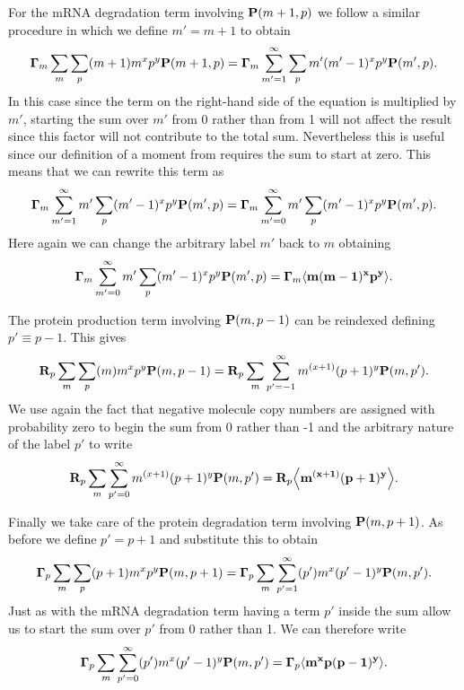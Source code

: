 For the mRNA degradation term involving $\mathbf{P}(m + 1, p)$ we follow a similar
procedure in which we define $m' = m + 1$ to obtain
\begin{equation}
  \mathbf{\Gamma}_m \sum_m \sum_p (m + 1) m^x p^y \mathbf{P}(m + 1, p) =
  \mathbf{\Gamma}_m \sum_{m' = 1}^\infty \sum_p m' (m' - 1)^x p^y \mathbf{P}(m', p).
\end{equation}
In this case since the term on the right-hand side of the equation is multiplied
by $m'$, starting the sum over $m'$ from 0 rather than from 1 will not affect
the result since this factor will not contribute to the total sum. Nevertheless
this is useful since our definition of a moment from  requires
the sum to start at zero. This means that we can rewrite this term as
\begin{equation}
  \mathbf{\Gamma}_m \sum_{m' = 1}^\infty m' \sum_p (m' - 1)^x p^y \mathbf{P}(m', p) =
  \mathbf{\Gamma}_m \sum_{m' = 0}^\infty m' \sum_p (m' - 1)^x p^y \mathbf{P}(m', p).
\end{equation}
Here again we can change the arbitrary label $m'$ back to $m$ obtaining
\begin{equation}
  \mathbf{\Gamma}_m \sum_{m' = 0}^\infty m' \sum_p (m' - 1)^x p^y \mathbf{P}(m', p) =
  \mathbf{\Gamma}_m \mathbf{\left\langle m (m - 1)^x p^y \right\rangle}.
\end{equation}

The protein production term involving $\mathbf{P}(m, p - 1)$ can be reindexed defining
$p' \equiv p - 1$. This gives
\begin{equation}
  \mathbf{R}_p \sum_m \sum_p (m) m^x p^y \mathbf{P}(m, p - 1) =
  \mathbf{R}_p \sum_m \sum_{p'=-1}^\infty m^{(x + 1)} (p + 1)^y \mathbf{P}(m, p').
\end{equation}
We use again the fact that negative molecule copy numbers are assigned with
probability zero to begin the sum from 0 rather than -1 and the arbitrary nature
of the label $p'$ to write
\begin{equation}
  \mathbf{R}_p \sum_m \sum_{p'=0}^\infty m^{(x + 1)} (p + 1)^y \mathbf{P}(m, p') =
  \mathbf{R}_p \mathbf{\left\langle m^{(x + 1)} (p + 1)^y \right\rangle}.
\end{equation}

Finally we take care of the protein degradation term involving $\mathbf{P}(m, p + 1)$.
As before we define $p' = p + 1$ and substitute this to obtain
\begin{equation}
  \mathbf{\Gamma}_p \sum_m \sum_p (p + 1) m^x p^y \mathbf{P}(m, p + 1) =
  \mathbf{\Gamma}_p \sum_m \sum_{p'=1}^\infty (p') m^x (p' - 1)^y \mathbf{P}(m, p').
\end{equation}
Just as with the mRNA degradation term having a term $p'$  inside the sum allow
us to start the sum over $p'$ from 0 rather than 1. We can therefore write
\begin{equation}
  \mathbf{\Gamma}_p \sum_m \sum_{p'=0}^\infty (p') m^x (p' - 1)^y \mathbf{P}(m, p') =
  \mathbf{\Gamma}_p \mathbf{\left\langle m^x p (p - 1)^y \right\rangle}.
\end{equation}

